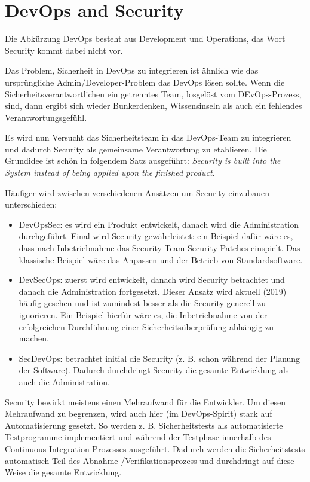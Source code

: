 \section{DevOps and Security}

Die Abkürzung DevOps besteht aus Development und Operations, das Wort Security kommt dabei nicht vor.

Das Problem, Sicherheit in DevOps zu integrieren ist ähnlich wie das ursprüngliche Admin/Developer-Problem das DevOps lösen sollte. Wenn die Sicherheitsverantwortlichen ein getrenntes Team, losgelöst vom DEvOps-Prozess, sind, dann ergibt sich wieder Bunkerdenken, Wissensinseln als auch ein fehlendes Verantwortungsgefühl.

Es wird nun Versucht das Sicherheitsteam in das DevOps-Team zu integrieren und dadurch Security als gemeinsame Verantwortung zu etablieren. Die Grundidee ist schön in folgendem Satz ausgeführt: \textit{Security is built into the System instead of being applied upon the finished product}.

Häufiger wird zwischen verschiedenen Ansätzen um Security einzubauen unterschieden:

\begin{itemize}
	\item DevOpsSec: es wird ein Produkt entwickelt, danach wird die Administration durchgeführt. Final wird Security gewährleistet: ein Beispiel dafür wäre es, dass nach Inbetriebnahme das Security-Team Security-Patches einspielt. Das klassische Beispiel wäre das Anpassen und der Betrieb von Standardsoftware.
	\item DevSecOps: zuerst wird entwickelt, danach wird Security betrachtet und danach die Administration fortgesetzt. Dieser Ansatz wird aktuell (2019) häufig gesehen und ist zumindest besser als die Security generell zu ignorieren. Ein Beispiel hierfür wäre es, die Inbetriebnahme von der erfolgreichen Durchführung einer Sicherheitsüberprüfung abhängig zu machen.
	\item SecDevOps: betrachtet initial die Security (z. B. schon während der Planung der Software). Dadurch durchdringt Security die gesamte Entwicklung als auch die Administration.
\end{itemize}

Security bewirkt meistens einen Mehraufwand für die Entwickler. Um diesen Mehraufwand zu begrenzen, wird auch hier (im DevOps-Spirit) stark auf Automatisierung gesetzt. So werden z. B. Sicherheitstests als automatisierte Testprogramme implementiert und während der Testphase innerhalb des Continuous Integration Prozesses ausgeführt. Dadurch werden die Sicherheitstests automatisch Teil des Abnahme-/Verifikationsprozess und durchdringt auf diese Weise die gesamte Entwicklung.

